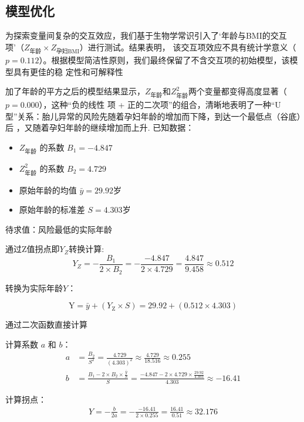 \documentclass[withoutpreface,notoc]{cumcmthesis}
\begin{document}
	
	
	\subsection{模型优化}

	为探索变量间复杂的交互效应，我们基于生物学常识引入了‘年龄与BMI的交互项’（$Z_{\text{年龄}} \times Z_{\text{孕妇BMI}}$）进行测试。结果表明，
	该交互项效应不具有统计学意义（$p=0.112$）。根据模型简洁性原则，我们最终保留了不含交互项的初始模型，该模型具有更佳的稳
	定性和可解释性

	加了年龄的平方之后的模型结果显示，$Z_{\text{年龄}}$和$Z^{2}_{\text{年龄}}$两个变量都变得高度显著（$p=0.000$），这种“负的线性
	项 + 正的二次项”的组合，清晰地表明了一种“U型”关系：胎儿异常的风险先随着孕妇年龄的增加而下降，到达一个最低点（谷底）后
	，又随着孕妇年龄的继续增加而上升.
	已知数据：
	\begin{itemize}
		\item 	$Z_{\text{年龄}} $ 的系数  $B_{1} = -4.847$
		\item 	$Z^{2}_{\text{年龄}}$ 的系数 $B_{2} = 4.729$
		\item 	原始年龄的均值 $\bar{y} = 29.92 $岁
		\item 	原始年龄的标准差 $S = 4.303 $岁
	\end{itemize}

	待求值：风险最低的实际年龄

	通过Z值拐点即$Y_{Z}$转换计算:
	\begin{equation}
	Y_{Z} = -\frac{B_1}{2 \times B_2} = -\frac{-4.847}{2 \times 4.729} = \frac{4.847}{9.458} \approx 0.512
	\end{equation}

	转换为实际年龄$Y$：

	\begin{equation}
	\text{Y} = \bar{y} + (Y_{\text{Z}} \times S) = 29.92 + (0.512 \times 4.303)
	\end{equation}

	通过二次函数直接计算

	计算系数 $a$ 和 $b$：
	\begin{align}
	a &= \frac{B_2}{S^2} = \frac{4.729}{(4.303)^2} \approx \frac{4.729}{18.516} \approx 0.255 \\
	b &= \frac{B_1 - 2 \times B_2 \times \frac{\bar{y}}{S}}{S} = \frac{-4.847 - 2 \times 4.729 \times \frac{29.92}{4.303}}{4.303} \approx -16.41
	\end{align}

	计算拐点：
	\begin{align}
	Y = -\frac{b}{2a} = -\frac{-16.41}{2 \times 0.255} = \frac{16.41}{0.51} \approx 32.176
	\end{align}
\end{document}
